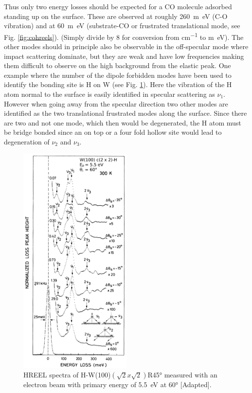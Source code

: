 Thus only two energy losses should be expected for a CO molecule adsorbed standing up on the surface. These are observed at roughly \SI{260}{m\electronvolt} (C-O vibration) and at \SI{60}{m\electronvolt} (substrate-CO or frustrated translational mode, see Fig. \ref{fig:cohreels}). (Simply divide by 8 for conversion from \si{cm^{-1}} to \si{m\electronvolt}). The other modes should in principle also be observable in the off-specular mode where impact scattering dominate, but they are weak and have low frequencies making them difficult to observe on the high background from the elastic peak. One example where the number of the dipole forbidden modes have been used to identify the bonding site is H on W \cite{Barnes} (see Fig. \ref{fig:hwhreels}). Here the vibration of the H atom normal to the surface is easily identified in specular scattering as  $\nu_1$. However when going away from the specular direction two other modes are  identified as the two translational frustrated modes along the surface. Since there are two and not one mode, which then would be degenerated, the H atom must be bridge bonded since an on top or a  four fold hollow site would lead to degeneration of $\nu_2$ and $\nu_3$.

\begin{figure}[h!]
	\begin{center}
	\includegraphics[width=0.5\textwidth]{figures/HREEL_spectra_H-W(100)(sqrt2_x_sqrt2).png}
	\caption{HREEL spectra of H-W(100)$(\sqrt{2}x\sqrt{2})$R\ang{45} measured with an electron beam with primary energy of \SI{5.5}{\electronvolt} at \ang{60} \cite{Barnes}[Adapted].}
	\label{fig:hwhreels}
	\end{center}
\end{figure}

